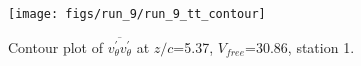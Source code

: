 \begin{figure}[H]
\centering
\texttt{[image: figs/run\_9/run\_9\_tt\_contour]}
\caption{Contour plot of $\overline{v_{\theta}^{\prime} v_{\theta}^{\prime}}$ at $z/c$=5.37, $V_{free}$=30.86, station 1.}
\label{fig:run_9_tt_contour}
\end{figure}


